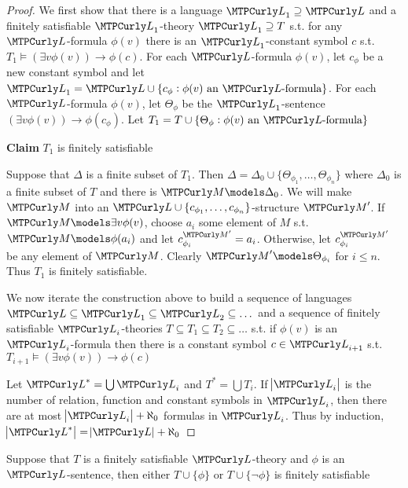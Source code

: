 \documentclass[11pt]{article}
\begin{document}
\begin{proof}
We first show that there is a language \(\call_1\supseteq\call\) and a
finitely satisfiable \(\call_1\)-theory \(\call_1\supseteq T\) s.t. for any
\(\call\)-formula \(\phi(v)\) there is an \(\call_1\)-constant symbol \(c\) s.t.
\(T_1\models(\exists v\phi(v))\to\phi(c)\). For each \(\call\)-formula
\(\phi(v)\), let \(c_\phi\) be a new constant symbol and let
\(\call_1=\call\cup\{c_\phi:\phi(v)\text{ an }\call\text{-formula}\}\). For
each \(\call\)-formula \(\phi(v)\), let \(\Theta_\phi\) be the
\(\call_1\)-sentence
\((\exists v\phi(v))\to\phi(c_\phi)\). Let
\(T_1=T\cup\{\Theta_\phi:\phi(v)\text{ an }\call\text{-formula}\}\)

\textbf{Claim} \(T_1\) is finitely satisfiable

Suppose that \(\Delta\) is a finite subset of \(T_1\). Then
\(\Delta=\Delta_0\cup\{\Theta_{\phi_1},\dots, \Theta_{\phi_n}\}\) where
\(\Delta_0\) is a finite subset of \(T\) and there is \(\calm\models\Delta_0\). We
will make \(\calm\) into an
\(\call\cup\{c_{\phi_1},\dots,c_{\phi_n}\}\)-structure \(\calm'\). If
\(\calm\models\exists v\phi(v)\), choose \(a_i\) some element of \(M\) s.t.
\(\calm\models\phi(a_i)\) and let \(c_{\phi_i}^{\calm'}=a_i\). Otherwise, let
\(c_{\phi_i}^{\calm'}\) be any element of \(\calm\). Clearly
\(\calm'\models\Theta_{\phi_i}\) for \(i\le n\). Thus \(T_1\) is finitely
satisfiable.

We now iterate the construction above to build a sequence of languages
\(\call\subseteq\call_1\subseteq\call_2\subseteq\dots\) and a sequence of
finitely satisfiable \(\call_i\)-theories \(T\subseteq T_1\subseteq
    T_2\subseteq\dots\) s.t. if \(\phi(v)\) is an \(\call_i\)-formula then there is
a constant symbol \(c\in\call_{i+1}\) s.t. \(T_{i+1}\models(\exists
    v\phi(v))\to\phi(c)\)

Let \(\call^*=\bigcup\call_i\) and \(T^*=\bigcup T_i\). 
If \(\abs{\call_i}\) is the number of relation, function and constant
symbols in \(\call_i\), then there are at most \(\abs{\call_i}+\aleph_0\)
formulas in \(\call_i\).
Thus by induction,
\(\abs{\call^*}=\abs{\call}+\aleph_0\) 
\end{proof}

\begin{lemma}[]
\label{2.1.9}
Suppose that \(T\) is a finitely satisfiable \(\call\)-theory and \(\phi\) is an
\(\call\)-sentence, then either \(T\cup\{\phi\}\) or \(T\cup\{\neg\phi\}\) is
finitely satisfiable
\end{lemma}
\end{document}
